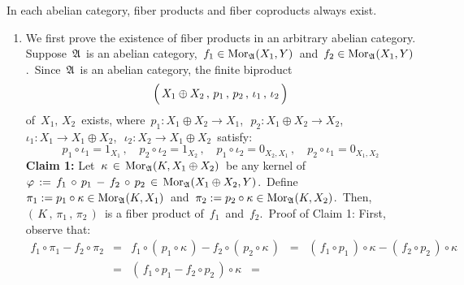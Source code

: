 \vskip 0.5cm
\begin{proposition}
\label{FiberProductFiberCoproductExistInAbelianCategories}
\mbox{}
\vskip 0.1cm
\noindent
In each abelian category,
fiber products and fiber coproducts always exist.
\end{proposition}
\proof
\begin{enumerate}
\item
	We first prove the existence of fiber products in an arbitrary abelian category.
	Suppose \,$\mathfrak{A}$\, is an abelian category,
	\,$f_{1} \in \textnormal{Mor}_{\mathfrak{A}}(X_{1},Y)$\,
	and
	\,$f_{2} \in \textnormal{Mor}_{\mathfrak{A}}(X_{1},Y)$.\,
	Since \,$\mathfrak{A}$\, is an abelian category, the finite {\color{red}biproduct}
	\begin{equation*}
	\left(\,
		X_{1} \overset{{\color{white}.}}{\oplus} X_{2}
		\,,\,
		p_{1}
		\,,\,
		p_{2}
		\,,\,
		\iota_{1}
		\,,\,
		\iota_{2}
		\,\right)
	\end{equation*}
	of \,$X_{1},\, X_{2}$\, exists, where
	\,$p_{1} : X_{1} \oplus X_{2} \longrightarrow X_{1}$,\,
	\,$p_{2} : X_{1} \oplus X_{2} \longrightarrow X_{2}$,\,
	\,$\iota_{1} : X_{1} \longrightarrow X_{1} \oplus X_{2}$,\,
	\,$\iota_{2} : X_{2} \longrightarrow X_{1} \oplus X_{2}$\,
	satisfy:
	\begin{equation*}
	p_{1} \circ \iota_{1} = 1_{X_{1}}\,,
	\quad
	p_{2} \circ \iota_{2} = 1_{X_{2}}\,,
	\quad
	p_{1} \circ \iota_{2} = 0_{X_{2},X_{1}}\,,
	\quad
	p_{2} \circ \iota_{1} = 0_{X_{1},X_{2}}
	\end{equation*}
	\vskip 0.3cm
	\noindent
	\textbf{Claim 1:}\quad
	Let \,$\kappa \,\in\, \textnormal{Mor}_{\mathfrak{A}}(K, X_{1}\oplus X_{2})$\,
	be any {\color{red}kernel of
	\,$\varphi\,:=\,f_{1}\,\circ\,p_{1}\,-\,f_{2}\,\circ\,p_{2}\,\in\,\textnormal{Mor}_{\mathfrak{A}}(X_{1} \oplus X_{2},Y)$}.\,
	Define
	\,$\pi_{1} := p_{1} \circ \kappa \in \textnormal{Mor}_{\mathfrak{A}}(K,X_{1})$\,
	and
	\,$\pi_{2} := p_{2} \circ \kappa \in \textnormal{Mor}_{\mathfrak{A}}(K,X_{2})$.\,
	Then,
	\,$\left(\,K\,,\,\pi_{1}\,,\,\pi_{2}\,\right)$\,
	is a fiber product of
	\,$f_{1}$\,
	and
	\,$f_{2}$.\,
	\vskip 0.2cm
	\noindent
	Proof of Claim 1:\;\;
	First, observe that:
	\begin{eqnarray*}
	f_{1} \circ \pi_{1} - f_{2} \circ \pi_{2}
	& = &
		f_{1} \circ (\,p_{1} \circ \kappa\,) - f_{2} \circ (\,p_{2} \circ \kappa\,)
	\;\; = \;\;
		(\,f_{1} \circ p_{1}\,) \circ \kappa - (\,f_{2} \circ p_{2}\,) \circ \kappa
	\\
	& = &
		(\,f_{1} \circ p_{1} - f_{2} \circ p_{2}\,) \circ \kappa
	\;\; = \;\;

\end{eqnarray*}
\end{enumerate}
